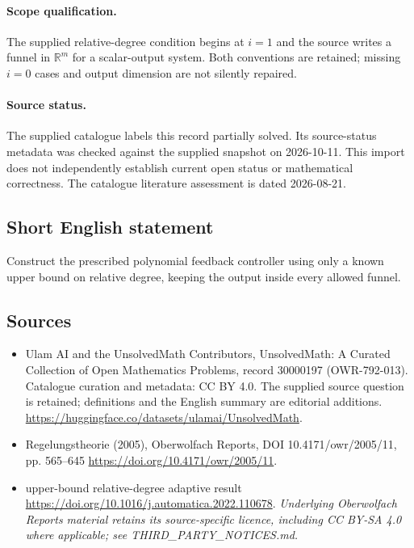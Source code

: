 \documentclass[11pt]{article}
\begin{document}
\paragraph{Scope qualification.}
The supplied relative-degree condition begins at $i=1$ and the source writes a funnel in $\mathbb R^m$ for a scalar-output system. Both conventions are retained; missing $i=0$ cases and output dimension are not silently repaired.
\paragraph{Source status.}
The supplied catalogue labels this record partially solved. Its source-status metadata was checked against the supplied snapshot on 2026-10-11. This import does not independently establish current open status or mathematical correctness. The catalogue literature assessment is dated 2026-08-21.
\subsection{Short English statement}
Construct the prescribed polynomial feedback controller using only a known upper bound on relative degree, keeping the output inside every allowed funnel.
\subsection{Sources}
\begin{itemize}
\item[\hypertarget{source:30000197:1}{S1}] Ulam AI and the UnsolvedMath Contributors, UnsolvedMath: A Curated Collection of Open Mathematics Problems, record 30000197 (OWR-792-013). Catalogue curation and metadata: CC BY 4.0. The supplied source question is retained; definitions and the English summary are editorial additions.
\url{https://huggingface.co/datasets/ulamai/UnsolvedMath}.
\item[\hypertarget{source:30000197:2}{S2}] Regelungstheorie (2005), Oberwolfach Reports, DOI 10.4171/owr/2005/11, pp. 565--645
\url{https://doi.org/10.4171/owr/2005/11}.
\item[\hypertarget{source:30000197:3}{S3}] upper-bound relative-degree adaptive result
\url{https://doi.org/10.1016/j.automatica.2022.110678}.
\textit{Underlying Oberwolfach Reports material retains its source-specific licence, including CC BY-SA 4.0 where applicable; see THIRD\_PARTY\_NOTICES.md.}
\end{itemize}
\end{document}
